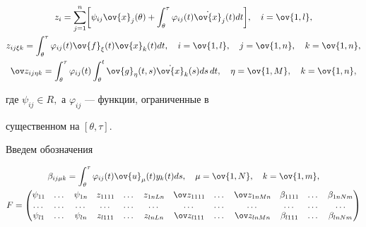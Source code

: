 \begin{gather}


z_i=\sum_{j=1}^n \biggl[ \psi_{ij} \ov{x}_j(\theta) +


\int_{\theta}^{\tau}


\varphi_{ij}(t) \Dot{\ov{x}}_j(t)dt\biggr],\quad


i=\ov{1,l},\\


%


z_{ij\xi k}= \int_{\theta}^{\tau} \varphi_{ij}(t) \ov{f}_{\xi}(t)


{\ov{x}}_k(t)dt,\quad i=\ov{1,l},\quad j=\ov{1,n},\quad


k=\ov{1,n},\\


%


\ov z_{ij\eta k} = \int_{\theta}^{\tau} \varphi_{ij}(t)


\int_{\theta}^t \ov{g}_{\eta}(t,s)


\Dot{\ov{x}}_k(s)ds\,dt,\quad \eta=\ov{1,M},\quad


k=\ov{1,n},


\end{gather}


где $\psi_{ij}\in R,$ а $\varphi_{ij}$ --- функции, ограниченные в


существенном на $[\theta,\tau].$





Введем обозначения


\begin{gather*}


\beta_{ij\mu k} = \int_{\theta}^{\tau} \varphi_{ij}(t)\ov{u}_{\mu}(t)


y_k(t) ds, \quad \mu=\ov{1,N},\quad k=\ov{1,m},\\


F=


\setcounter{MaxMatrixCols}{12}


\begin{pmatrix}


\psi_{11}&\dots & \psi_{1n} & z_{1111} & \dots & z_{1nLn} & {\ov z_{1111}} & %


\dots & {\ov z_{1nMn}} & \beta_{1111} & \dots & \beta_{1nNm} \\


\dots&\dots & \dots & \dots & \dots & \dots & \dots & \dots & \dots &\dots & %


\dots & \dots \\


\psi_{l1}&\dots & \psi_{ln} & z_{l111} & \dots & z_{lnLn} & {\ov z_{l111}} & %


\dots & {\ov z_{lnMn}} & \beta_{l111} & \dots & \beta_{lnNm}


\end{pmatrix}


\end{gather*} 


